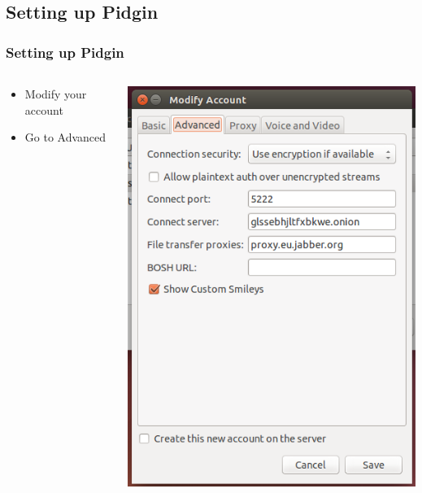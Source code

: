 \documentclass{beamer}
\begin{document}
\subsection{Setting up Pidgin}
\begin{frame}
\frametitle{Setting up Pidgin}
\begin{columns}
    \begin{column}{0.48\textwidth}
        \begin{itemize}
          \item Modify your account
          \item Go to Advanced
        \end{itemize}
    \end{column}
    \begin{column}{.5\textwidth}
        \includegraphics[width=.9\linewidth]{pidgin_advanced}
    \end{column}
\end{columns}
\end{frame}
\end{document}
